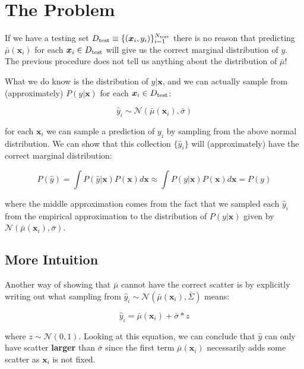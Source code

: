 \documentclass[a4paper]{article}
\newcommand{\pth}[1]{\left(#1\right)}
\renewcommand{\vec}[1]{\boldsymbol{#1}}
\newcommand{\xv}[0]{\vec{x}}
\begin{document}
\section{The Problem}

If we have a testing set $D_{\rm test} \equiv \{\left(\xv_{i}, y_{i}\right)\}_{i=1}^{N_{\rm test}}$ there is no reason that predicting $\bar{\mu}\pth{\xv_{i}}$ for each $\xv_{i} \in D_{\rm test}$ will give us the correct marginal distribution of $y$. The previous procedure does not tell us anything about the distribution of $\bar{\mu}$!

What we do know is the distribution of $y \vert \xv$, and we can actually sample from (approximately) $P\pth{y \vert \xv}$ for each $\xv_{i} \in D_{\rm test}$: 

\[
	\hat{y}_{i} \sim \mathcal{N} \left(\bar{\mu}\pth{\xv_{i}}, \bar{\sigma} \right)
\]

for each $\xv_{i}$ we can sample a prediction of $y_{i}$ by sampling from the above normal distribution. We can show that this collection $\{\hat{y}_{i}\}$ will (approximately) have the correct marginal distribution:

\[
	P(\hat{y}) = \int P(\hat{y} \vert \xv) P(\xv) d\xv \approx \int P(y \vert \xv) P(\xv) d\xv = P(y)
\]

where the middle approximation comes from the fact that we sampled each $\hat{y}_{i}$ from the empirical approximation to the distribution of $P(y|\xv)$ given by $\mathcal{N} \left(\bar{\mu}\pth{\xv_{i}}, \bar{\sigma} \right)$.


\subsection{More Intuition}

Another way of showing that $\bar{\mu}$ cannot have the correct scatter is by explicitly writing out what sampling from $\hat{y}_{i} \sim \mathcal{N} \left(\bar{\mu}\pth{\xv_{i}}, \bar{\Sigma} \right)$ means: 

\[
\hat{y}_{i} = \bar{\mu} \pth{\xv_{i}}  + \bar{\sigma} * z 
\]

where $z \sim \mathcal{N}\pth{0,1}$. Looking at this equation, we can conclude that $\hat{y}$ can only have scatter \textbf{larger} than $\bar{\sigma}$ since the first term $\bar{\mu} \pth{\xv_{i}}$ necessarily adds some scatter as $\xv_{i}$ is not fixed.
\end{document}
